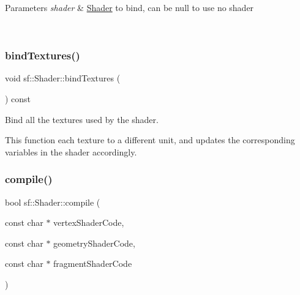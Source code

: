 \begin{DoxyParams}{Parameters}
{\em shader} & \mbox{\hyperlink{classsf_1_1_shader}{Shader}} to bind, can be null to use no shader \begin{DoxyVerb}\end{DoxyVerb}
 \\
\hline
\end{DoxyParams}
\mbox{\label{classsf_1_1_shader_a091595f44919468606a36e3414b5106e}} 
\subsubsection{\texorpdfstring{bindTextures()}{bindTextures()}}
{\footnotesize\ttfamily void sf\+::\+Shader\+::bind\+Textures (\begin{DoxyParamCaption}{ }\end{DoxyParamCaption}) const\hspace{0.3cm}{\ttfamily [private]}}



Bind all the textures used by the shader. 

This function each texture to a different unit, and updates the corresponding variables in the shader accordingly. \begin{DoxyVerb}\end{DoxyVerb}
 \mbox{\label{classsf_1_1_shader_ae83560b673e726e48fc032f62584d606}} 
\subsubsection{\texorpdfstring{compile()}{compile()}}
{\footnotesize\ttfamily bool sf\+::\+Shader\+::compile (\begin{DoxyParamCaption}\item[{const char $\ast$}]{vertex\+Shader\+Code,  }\item[{const char $\ast$}]{geometry\+Shader\+Code,  }\item[{const char $\ast$}]{fragment\+Shader\+Code }\end{DoxyParamCaption})\hspace{0.3cm}{\ttfamily [private]}}



